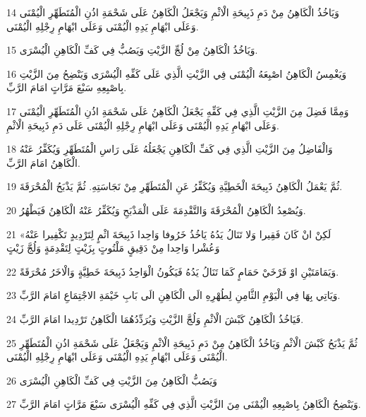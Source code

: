 \par 14 وَيَاخُذُ الْكَاهِنُ مِنْ دَمِ ذَبِيحَةِ الْاثْمِ وَيَجْعَلُ الْكَاهِنُ عَلَى شَحْمَةِ اذُنِ الْمُتَطَهِّرِ الْيُمْنَى وَعَلَى ابْهَامِ يَدِهِ الْيُمْنَى وَعَلَى ابْهَامِ رِجْلِهِ الْيُمْنَى.
\par 15 وَيَاخُذُ الْكَاهِنُ مِنْ لُجِّ الزَّيْتِ وَيَصُبُّ فِي كَفِّ الْكَاهِنِ الْيُسْرَى.
\par 16 وَيَغْمِسُ الْكَاهِنُ اصْبِعَهُ الْيُمْنَى فِي الزَّيْتِ الَّذِي عَلَى كَفِّهِ الْيُسْرَى وَيَنْضِحُ مِنَ الزَّيْتِ بِاصْبِعِهِ سَبْعَ مَرَّاتٍ امَامَ الرَّبِّ.
\par 17 وَمِمَّا فَضِلَ مِنَ الزَّيْتِ الَّذِي فِي كَفِّهِ يَجْعَلُ الْكَاهِنُ عَلَى شَحْمَةِ اذُنِ الْمُتَطَهِّرِ الْيُمْنَى وَعَلَى ابْهَامِ يَدِهِ الْيُمْنَى وَعَلَى ابْهَامِ رِجْلِهِ الْيُمْنَى عَلَى دَمِ ذَبِيحَةِ الْاثْمِ.
\par 18 وَالْفَاضِلُ مِنَ الزَّيْتِ الَّذِي فِي كَفِّ الْكَاهِنِ يَجْعَلُهُ عَلَى رَاسِ الْمُتَطَهِّرِ وَيُكَفِّرُ عَنْهُ الْكَاهِنُ امَامَ الرَّبِّ.
\par 19 ثُمَّ يَعْمَلُ الْكَاهِنُ ذَبِيحَةَ الْخَطِيَّةِ وَيُكَفِّرُ عَنِ الْمُتَطَهِّرِ مِنْ نَجَاسَتِهِ. ثُمَّ يَذْبَحُ الْمُحْرَقَةَ.
\par 20 وَيُصْعِدُ الْكَاهِنُ الْمُحْرَقَةَ وَالتَّقْدِمَةَ عَلَى الْمَذْبَحِ وَيُكَفِّرُ عَنْهُ الْكَاهِنُ فَيَطْهُرُ.
\par 21 «لَكِنْ انْ كَانَ فَقِيرا وَلا تَنَالُ يَدُهُ يَاخُذُ خَرُوفا وَاحِدا ذَبِيحَةَ اثْمٍ لِتَرْدِيدٍ تَكْفِيرا عَنْهُ وَعُشْرا وَاحِدا مِنْ دَقِيقٍ مَلْتُوتٍ بِزَيْتٍ لِتَقْدِمَةٍ وَلُجَّ زَيْتٍ
\par 22 وَيَمَامَتَيْنِ اوْ فَرْخَيْ حَمَامٍ كَمَا تَنَالُ يَدُهُ فَيَكُونُ الْوَاحِدُ ذَبِيحَةَ خَطِيَّةٍ وَالْاخَرُ مُحْرَقَةً.
\par 23 وَيَاتِي بِهَا فِي الْيَوْمِ الثَّامِنِ لِطُهْرِهِ الَى الْكَاهِنِ الَى بَابِ خَيْمَةِ الاجْتِمَاعِ امَامَ الرَّبِّ.
\par 24 فَيَاخُذُ الْكَاهِنُ كَبْشَ الْاثْمِ وَلُجَّ الزَّيْتِ وَيُرَدِّدُهُمَا الْكَاهِنُ تَرْدِيدا امَامَ الرَّبِّ.
\par 25 ثُمَّ يَذْبَحُ كَبْشَ الْاثْمِ وَيَاخُذُ الْكَاهِنُ مِنْ دَمِ ذَبِيحَةِ الْاثْمِ وَيَجْعَلُ عَلَى شَحْمَةِ اذُنِ الْمُتَطَهِّرِ الْيُمْنَى وَعَلَى ابْهَامِ يَدِهِ الْيُمْنَى وَعَلَى ابْهَامِ رِجْلِهِ الْيُمْنَى.
\par 26 وَيَصُبُّ الْكَاهِنُ مِنَ الزَّيْتِ فِي كَفِّ الْكَاهِنِ الْيُسْرَى
\par 27 وَيَنْضِحُ الْكَاهِنُ بِاصْبِعِهِ الْيُمْنَى مِنَ الزَّيْتِ الَّذِي فِي كَفِّهِ الْيُسْرَى سَبْعَ مَرَّاتٍ امَامَ الرَّبِّ.
